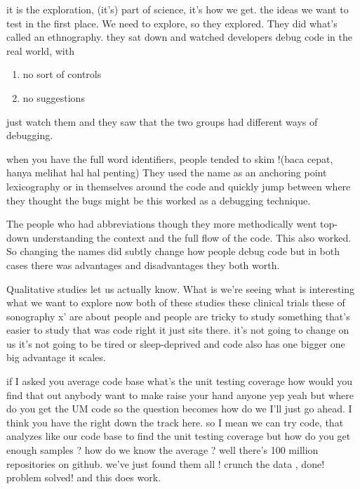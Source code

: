 \documentclass[14pt]{extreport}
\begin{document}
it is the exploration, (it's) part of science, it’s how we get. 
the ideas we want to test in the first place.
We need to explore, so they explored. 
They did what’s called an ethnography.
they sat down and watched developers debug code in the real world, with 
\begin{enumerate}
\item no sort of controls
\item no suggestions 
\end{enumerate}
just watch them and they saw that the two groups had different ways of debugging.
\par
when you have the full word identifiers, people tended to skim !(baca cepat, hanya melihat hal hal penting) 
They used the name as an anchoring point lexicography or in themselves around the code and quickly jump between where they thought the bugs might be this worked as a debugging technique.
\par
The people who had abbreviations though they more methodically went top-down understanding the context and the full flow of the code. This also worked. 
So changing the names did subtly change how people debug code but in both cases there was advantages and disadvantages they both worth. 
\par
Qualitative studies let us actually know.
What is we're seeing what is interesting what we want to explore
now both of these studies these clinical trials these of sonography x' are about
people and people are tricky to study
something that's easier to study that
was code right it just sits there.
it's not going to change on us it's not going
to be tired or sleep-deprived and code
also has one bigger one big advantage it
scales. \par
if I asked you average code base
what's the unit testing coverage how
would you find that out anybody want to
make raise your hand anyone yep yeah but
where do you get the UM code so the
question becomes how do we I'll just go
ahead.
I think you have the right down the track here.
so I mean we can try code,  that analyzes like our code base to find
the unit testing coverage but how do you
get enough samples ?
how do we know the average ?
well there's 100 million repositories on github. 
we've just found them all ! crunch the data , done!  problem solved! and this does work.
\end{document}
